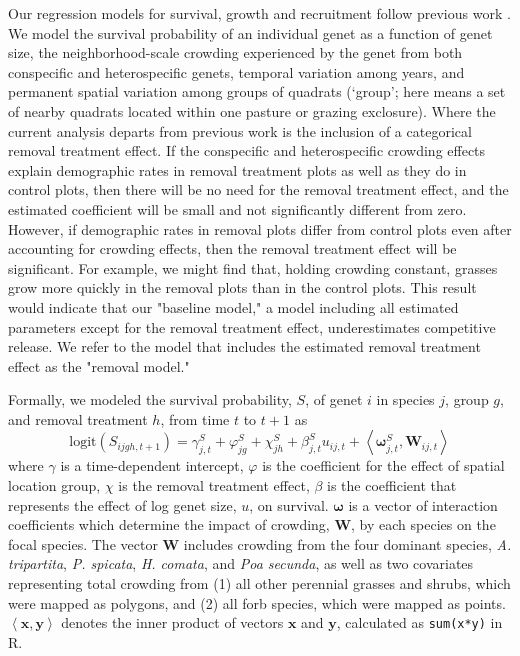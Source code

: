\documentclass[11pt]{article}
\begin{document}
\begin{doublespacing}
Our regression models for survival, growth and recruitment follow previous work \citep{adler_coexistence_2010,chu_large_2015}. We model the survival probability of an individual genet as a function of genet size, the neighborhood-scale crowding experienced by the genet from both conspecific and heterospecific genets, temporal variation among years, and permanent spatial variation among groups of quadrats (`group'; here means a set of nearby quadrats located within one pasture or grazing exclosure). Where the current analysis departs from previous work is the inclusion of a categorical removal treatment effect. If the conspecific and heterospecific crowding effects explain demographic rates in removal treatment plots as well as they do in control plots, then there will be no need for the removal treatment effect, and the estimated coefficient will be small and not significantly different from zero. However, if demographic rates in removal plots differ from control plots even after accounting for crowding effects, then the removal treatment effect will be significant. For example, we might find that, holding crowding constant, grasses grow more quickly in the removal plots than in the control plots. This result would indicate that our "baseline model," a model including all estimated parameters except for the removal treatment effect, underestimates competitive release. We refer to the model that includes the estimated removal treatment effect as the "removal model."

Formally, we modeled the survival probability, $S$, of genet $i$ in species $j$, group $g$, and removal treatment $h$, from time $t$ to $t+1$  as
\begin{equation}
\mbox{logit}(S_{ijgh,t+1}) = \gamma_{j,t}^S + \varphi_{jg}^S+  \chi_{jh}^S  + \beta_{j,t}^S u_{ij,t} +  
\left \langle \boldsymbol{\omega}_{j,t}^S, \boldsymbol{W}_{ij,t} \right \rangle 
\label{eqn:survReg}
\end{equation}
where $\gamma$ is a time-dependent intercept, $\varphi$ is the coefficient for the effect of spatial location group, $\chi$ is the removal treatment effect, $\beta$ is the coefficient that represents the effect of log genet size, $u$, on survival. $\boldsymbol{\omega}$ is a vector of interaction coefficients which determine the impact of crowding, $\boldsymbol{W}$, by each species on the focal species. The vector $\boldsymbol{W}$ includes crowding from the four dominant species,  \textit{A. tripartita}, \textit{P. spicata}, \textit{H. comata}, and \textit{Poa secunda}, as well as two covariates representing total crowding from (1) all other perennial grasses and shrubs, which were mapped as polygons, and (2) all forb species, which were mapped as points. 
$\left \langle \boldsymbol{x, y} \right \rangle$ denotes the inner product of vectors $\boldsymbol{x}$ and $\boldsymbol{y}$, 
calculated as \texttt{sum(x*y)} in R.


\end{doublespacing}
\end{document}
